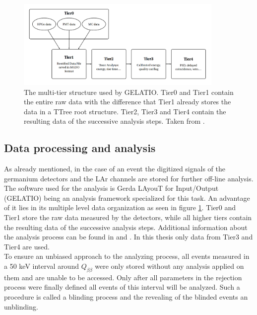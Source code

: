 \documentclass[encoding=utf8,british]{tumphthesis}
\begin{document}
\begin{figure}[t!]
	\centering
		\includegraphics[width=100mm]{./Bilder/TierStructure.png}
		\caption{
		The multi-tier structure used by GELATIO. 
		Tier0 and Tier1 contain the entire raw data with the difference that Tier1 already stores the data in a TTree root structure.
		Tier2, Tier3 and Tier4 contain the resulting data of the successive analysis steps.
		Taken from \cite{agostini_gelatio:_2011}.
		}
		\label{fig:TierStructure}
\end{figure}

\subsection{Data processing and analysis}
\label{sec:DataProc}



As already mentioned, in the case of an event the digitized signals of the germanium detectors and the LAr channels are stored for further off-line analysis.
The software used for the analysis is Gerda LAyouT for Input/Output (GELATIO) being an analysis framework specialized for this task.
An advantage of it lies in its multiple level data organization as seen in figure \ref{fig:TierStructure}.
Tier0 and Tier1 store the raw data measured by the detectors, while all higher tiers contain the resulting data of the successive analysis steps.
Additional information about the analysis process can be found in \cite{agostini_gelatio:_2011} and \cite{agostini_off-line_2011}.
In this thesis only data from Tier3 and Tier4 are used.
\\

To ensure an unbiased approach to the analyzing process, all events measured in a  50 keV interval around $Q_{\beta\beta}$ were only stored without any analysis applied on them and are unable to be accessed.
Only after all parameters in the rejection process were finally defined all events of this interval will be analyzed.
Such a procedure is called a blinding process and the revealing of the blinded events an unblinding.
\\
\end{document}
